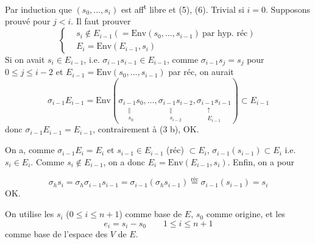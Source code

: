 Par induction  que $(s_0,\ldots,s_i)$ est aff\textsuperscript{t} libre et (5), (6). Trivial si $i=0$. Supposons  prouvé pour $j<i$. Il faut prouver
\[
\left\{\begin{aligned}
&s_i\notin E_{i-1}(=\mathrm{Env}(s_0,\ldots,s_{i-1})\ \text{par hyp. réc})\\
&E_i=\mathrm{Env}(E_{i-1},s_i)
\end{aligned}\right.
\]
Si on avait $s_i\in E_{i-1}$, i.e. $\sigma_{i-1}s_{i-1}\in E_{i-1}$, comme $\sigma_{i-1}s_j=s_j$ pour $0\leq j\leq i-2$ et $E_{i-1}=\mathrm{Env}(s_0,\ldots,s_{i-1})$ par réc, on aurait
\[
\sigma_{i-1}E_{i-1}=\mathrm{Env}(\underset{\substack{\Vert\\s_0}}{\sigma_{i-1}s_0},\ldots,\underset{\substack{\Vert\\s_{i-2}}}{\sigma_{i-1}s_{i-2}},\underset{\substack{\uparrow\\E_{i-1}}}{\sigma_{i-1}s_{i-1}})\subset E_{i-1}
\]
donc $\sigma_{i-1}E_{i-1}=E_{i-1}$, contrairement à (3 b), OK.

On a, comme $\sigma_{i-1}E_i=E_i$ et $s_{i-1}\in E_{i-1}$ (réc) $\subset E_i$, $\sigma_{i-1}(s_{i-1})\subset E_i$ i.e. $s_i\in E_i$. Comme $s_i\notin E_{i-1}$, on a donc $E_i=\mathrm{Env}(E_{i-1},s_i)$. Enfin, on a pour 

\[
\sigma_hs_i=\sigma_h\sigma_{i-1}s_{i-1}=\sigma_{i-1}(\sigma_hs_{i-1})\overset{\text{réc}}{=}\sigma_{i-1}(s_{i-1})=s_i
\]
OK.

On utilise les $s_i$ ($0\leq i\leq n+1$) comme base de $E$,  $s_0$ comme origine, et les
\[
e_i=s_i-s_0\qquad1\leq i\leq n+1\tag*{(7)}
\]
comme base de l'espace des  $V$ de $E$.

